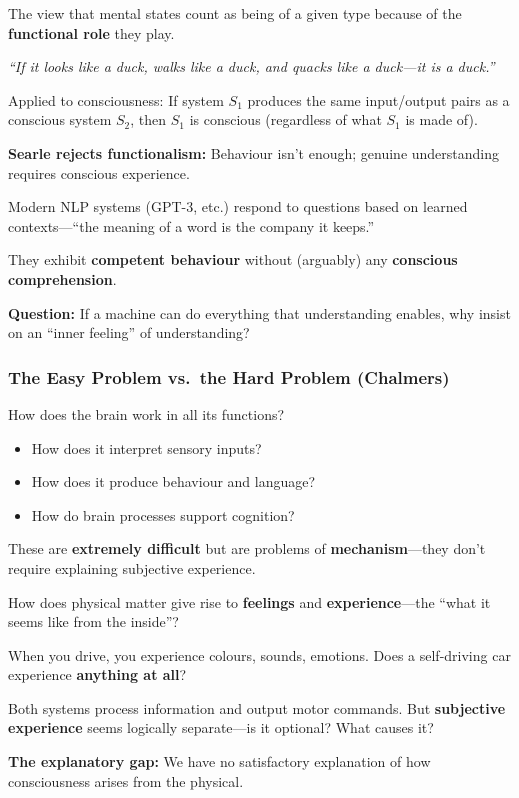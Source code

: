 \begin{defbox}[Functionalism]
The view that mental states count as being of a given type because of the \textbf{functional role} they play.

\textit{``If it looks like a duck, walks like a duck, and quacks like a duck---it is a duck.''}

Applied to consciousness: If system $S_1$ produces the same input/output pairs as a conscious system $S_2$, then $S_1$ is conscious (regardless of what $S_1$ is made of).

\textbf{Searle rejects functionalism:} Behaviour isn't enough; genuine understanding requires conscious experience.
\end{defbox}

\begin{exbox}
Modern NLP systems (GPT-3, etc.) respond to questions based on learned contexts---``the meaning of a word is the company it keeps.''

They exhibit \textbf{competent behaviour} without (arguably) any \textbf{conscious comprehension}.

\textbf{Question:} If a machine can do everything that understanding enables, why insist on an ``inner feeling'' of understanding?
\end{exbox}

\bigseparator

\subsubsection{The Easy Problem vs.\ the Hard Problem (Chalmers)}

\begin{defbox}
How does the brain work in all its functions?
\begin{itemize}
  \item How does it interpret sensory inputs?
  \item How does it produce behaviour and language?
  \item How do brain processes support cognition?
\end{itemize}

These are \textbf{extremely difficult} but are problems of \textbf{mechanism}---they don't require explaining subjective experience.
\end{defbox}

\begin{defbox}
How does physical matter give rise to \textbf{feelings} and \textbf{experience}---the ``what it seems like from the inside''?

When you drive, you experience colours, sounds, emotions. Does a self-driving car experience \textbf{anything at all}?

Both systems process information and output motor commands. But \textbf{subjective experience} seems logically separate---is it optional? What causes it?

\textbf{The explanatory gap:} We have no satisfactory explanation of how consciousness arises from the physical.
\end{defbox}

